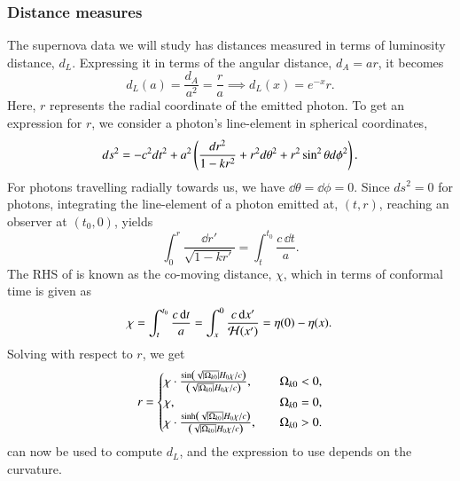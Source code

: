 \subsubsection{Distance measures} 
The supernova data we will study has distances measured in terms of luminosity distance, $d_L$. Expressing it in terms of the angular distance, $d_A=ar$, it becomes 
\begin{equation}
    d_L(a) = \frac{d_A}{a^2} = \frac{r}{a} \implies d_L(x)=e^{-x}r. \label{eq:M1:theory:dL_of_a_general expression}
\end{equation} 
Here, $r$ represents the radial coordinate of the emitted photon. To get an expression for $r$, we consider a photon's line-element in spherical coordinates,
\begin{equation}
    ds^2 = -c^2 dt^2 + a^2 \left( \frac{dr^2}{1-kr^2} + r^2 d\theta^2 + r^2 \sin^2\theta d\phi^2 \right). \label{eq:M1:theory:FLRW_general_nonflat_spherical}
\end{equation} 
For photons travelling radially towards us, we have $\dd \theta=\dd\phi=0$. Since $ds^2=0$ for photons, integrating the line-element of a photon emitted at, $(t,r)$, reaching an observer at $(t_0, 0)$, yields 
\begin{equation}
    \int_0^r \frac{\dd r'}{\sqrt{1-k r'}} = \int_t^{t_0} \frac{c\,\dd t}{a}. \label{eq:M1:theory:comoving_distance_integral_expression}
\end{equation} 
%
The RHS of  is known as the co-moving distance, $\chi$, which in terms of conformal time is given as  
\begin{equation}
    \chi = \int_t^{t_0} \frac{c\,\dd t}{a} = \int_x^0 \frac{c\,\dd x'}{\mathcal{H}(x')} = \eta(0) - \eta(x). \label{eq:M1:theory:chi_eta0_minus_eta_of_x}
\end{equation}
%
Solving  with respect to $r$, we get
\begin{equation}
    r = \begin{cases}
        \chi\cdot \frac{\sin\left( \sqrt{\abs{\Omega_{k0}}} H_0 \chi / c \right)}{\left( \sqrt{\abs{\Omega_{k0}}} H_0 \chi / c \right)},\quad &\Omega_{k0} < 0, \\ 
        \chi,\quad &\Omega_{k0}=0, \\ 
        \chi\cdot \frac{\sinh\left( \sqrt{\abs{\Omega_{k0}}} H_0 \chi / c \right)}{\left( \sqrt{\abs{\Omega_{k0}}} H_0 \chi / c \right)},\quad &\Omega_{k0} > 0.
    \end{cases}
\end{equation} 
 can now be used to compute $d_L$, and the expression to use depends on the curvature.     


